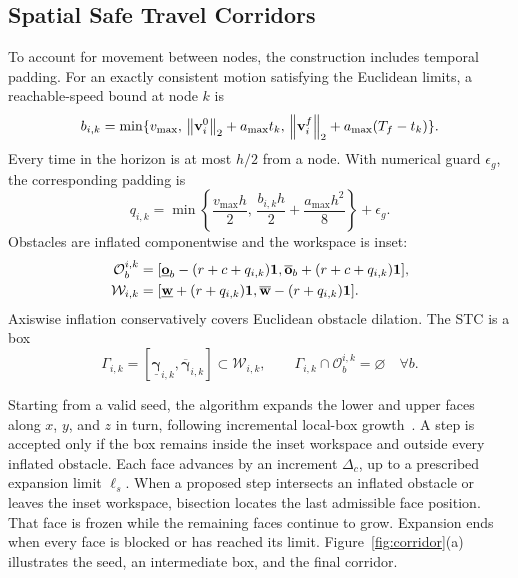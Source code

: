 \subsection{Spatial Safe Travel Corridors}
To account for movement between nodes, the construction includes temporal padding. For an exactly consistent motion satisfying the Euclidean limits, a reachable-speed bound at node $k$ is
\begin{equation}
 b_{i,k}=\min\{v_{\max},\,\left\lVert \mathbf{v}_i^0\right\rVert_2+a_{\max}t_k,\,
 \left\lVert \mathbf{v}_i^f\right\rVert_2+a_{\max}(T_f-t_k)\}.
 \label{eq:rate}
\end{equation}
Every time in the horizon is at most $h/2$ from a node. With numerical guard $\epsilon_g$, the corresponding padding is
\begin{equation}
 q_{i,k}=\min\left\{\frac{v_{\max}h}{2},\,
 \frac{b_{i,k}h}{2}+\frac{a_{\max}h^2}{8}\right\}+\epsilon_g.
 \label{eq:padding}
\end{equation}
Obstacles are inflated componentwise and the workspace is inset:
\begin{subequations}\label{eq:inflation}\begin{align}
 \mathcal O_b^{i,k}&=[\underline{\mathbf o}_b-(r+c+q_{i,k})\mathbf{1},
 \overline{\mathbf o}_b+(r+c+q_{i,k})\mathbf{1}],\\
 \mathcal W_{i,k}&=[\underline{\mathbf w}+(r+q_{i,k})\mathbf{1},
 \overline{\mathbf w}-(r+q_{i,k})\mathbf{1}].
\end{align}\end{subequations}
Axiswise inflation conservatively covers Euclidean obstacle dilation. The STC is a box
\begin{equation}
 \Gamma_{i,k}=[\underline{\boldsymbol\gamma}_{i,k},\overline{\boldsymbol\gamma}_{i,k}]
 \subset\mathcal W_{i,k},\qquad
 \Gamma_{i,k}\cap\mathcal O_b^{i,k}=\varnothing\quad\forall b.
 \label{eq:stc}
\end{equation}

Starting from a valid seed, the algorithm expands the lower and upper faces along $x$, $y$, and $z$ in turn, following incremental local-box growth~\cite{li2022liom}. A step is accepted only if the box remains inside the inset workspace and outside every inflated obstacle. Each face advances by an increment $\Delta_c$, up to a prescribed expansion limit $\ell_s$. When a proposed step intersects an inflated obstacle or leaves the inset workspace, bisection locates the last admissible face position. That face is frozen while the remaining faces continue to grow. Expansion ends when every face is blocked or has reached its limit. Figure~\ref{fig:corridor}(a) illustrates the seed, an intermediate box, and the final corridor.

